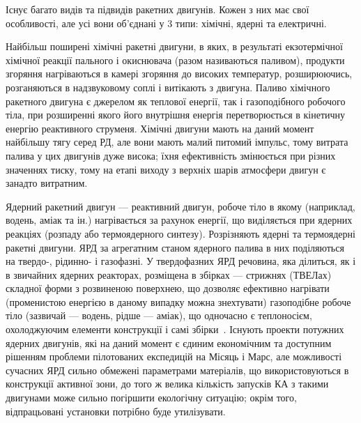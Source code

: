 Існує багато видів та підвидів ракетних двигунів. Кожен з них має свої особливості, але усі вони об’єднані у 3 типи: хімічні, ядерні та електричні. 

Найбільш поширені хімічні ракетні двигуни, в яких, в результаті екзотермічної хімічної реакції пального і окиснювача (разом називаються паливом), продукти згоряння нагріваються в камері згоряння до високих температур, розширюючись, розганяються в надзвуковому соплі і витікають з двигуна. Паливо хімічного ракетного двигуна є джерелом як теплової енергії, так і газоподібного робочого тіла, при розширенні якого його внутрішня енергія перетворюється в кінетичну енергію реактивного струменя. Хімічні двигуни мають на даний момент найбільшу тягу серед РД, але вони мають малий питомий імпульс, тому витрата палива у цих двигунів дуже висока; їхня ефективність змінюється при різних значеннях тиску, тому на етапі виходу з верхніх шарів атмосфери двигун є занадто витратним.

Ядерний ракетний двигун --- реактивний двигун, робоче тіло в якому (наприклад, водень, аміак та ін.) нагрівається за рахунок енергії, що виділяється при ядерних реакціях (розпаду або термоядерного синтезу). Розрізняють ядерні та термоядерні ракетні двигуни. ЯРД за агрегатним станом ядерного палива в них поділяються на твердо-, рідинно- і газофазні. У твердофазних ЯРД речовина, яка ділиться, як і в звичайних ядерних реакторах, розміщена в збірках --- стрижнях (ТВЕЛах) складної форми з розвиненою поверхнею, що дозволяє ефективно нагрівати (променистою енергією в даному випадку можна знехтувати) газоподібне робоче тіло (зазвичай --- водень, рідше --- аміак), що одночасно є теплоносієм, охолоджуючим елементи конструкції і самі збірки~\cite[с. 11 -- 12]{Koroteyev}. Існують проекти потужних ядерних двигунів, які на даний момент є єдиним економічним та доступним рішенням проблеми пілотованих експедицій на Місяць і Марс, але можливості сучасних ЯРД сильно обмежені параметрами матеріалів, що використовуються в конструкції активної зони, до того ж велика кількість запусків КА з такими двигунами може сильно погіршити екологічну ситуацію; окрім того, відпрацьовані установки потрібно буде утилізувати.

